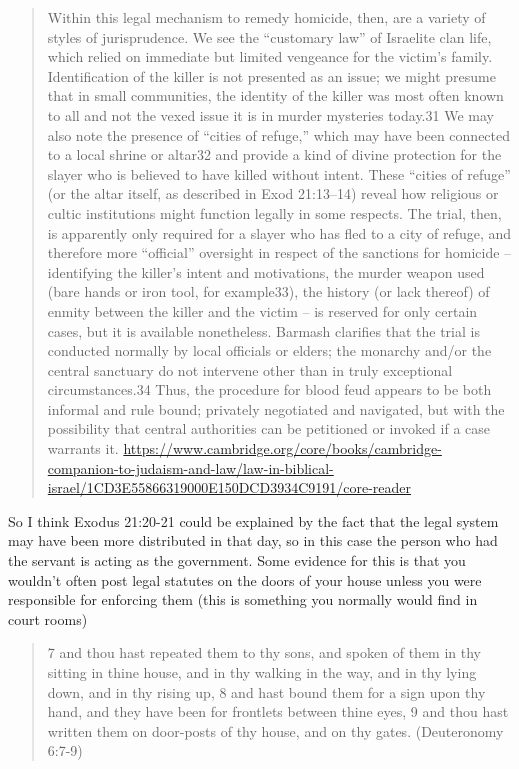 \documentclass[11pt]{article}
\begin{document}
\begin{quote}
Within this legal mechanism to remedy homicide, then, are a variety of styles of jurisprudence. We see the “customary law” of Israelite clan life, which relied on immediate but limited vengeance for the victim’s family. Identification of the killer is not presented as an issue; we might presume that in small communities, the identity of the killer was most often known to all and not the vexed issue it is in murder mysteries today.31 We may also note the presence of “cities of refuge,” which may have been connected to a local shrine or altar32 and provide a kind of divine protection for the slayer who is believed to have killed without intent. These “cities of refuge” (or the altar itself, as described in Exod 21:13–14) reveal how religious or cultic institutions might function legally in some respects. The trial, then, is apparently only required for a slayer who has fled to a city of refuge, and therefore more “official” oversight in respect of the sanctions for homicide – identifying the killer’s intent and motivations, the murder weapon used (bare hands or iron tool, for example33), the history (or lack thereof) of enmity between the killer and the victim – is reserved for only certain cases, but it is available nonetheless. Barmash clarifies that the trial is conducted normally by local officials or elders; the monarchy and/or the central sanctuary do not intervene other than in truly exceptional circumstances.34 Thus, the procedure for blood feud appears to be both informal and rule bound; privately negotiated and navigated, but with the possibility that central authorities can be petitioned or invoked if a case warrants it.
\url{https://www.cambridge.org/core/books/cambridge-companion-to-judaism-and-law/law-in-biblical-israel/1CD3E55866319000E150DCD3934C9191/core-reader}
\end{quote}

So I think Exodus 21:20-21 could be explained by the fact that the legal system may have been more distributed in that day, so in this case the person who had the servant is acting as the government. Some evidence for this is that you wouldn't often post legal statutes on the doors of your house unless you were responsible for enforcing them (this is something you normally would find in court rooms)


\begin{quote}
7 and thou hast repeated them to thy sons, and spoken of them in thy sitting in thine house, and in thy walking in the way, and in thy lying down, and in thy rising up,
8 and hast bound them for a sign upon thy hand, and they have been for frontlets between thine eyes,
9 and thou hast written them on door-posts of thy house, and on thy gates. (Deuteronomy 6:7-9)
\end{quote} 
\end{document}
